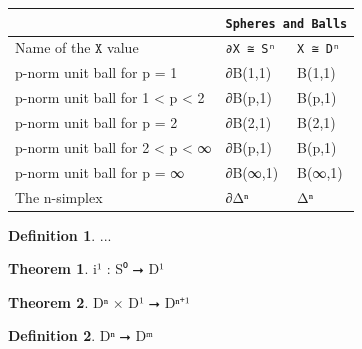 \documentclass{book}
\theoremstyle{definition}
\newtheorem{definition}{Definition}
\newtheorem{theorem}{Theorem}
\begin{document}
{
\footnotesize
\begin{center}
\begin{tabular}{||l || l || l ||} 
 \hline
  & \multicolumn{2}{||c||}{\texttt{Spheres and Balls}} \\
 \hline
 Name of the $\texttt{X}$ value & \texttt{∂X ≅ Sⁿ} & \texttt{X ≅ Dⁿ} \\
 \hline
 \hline
 p-norm unit ball for p = 1 & ∂B(1,1) & B(1,1) \\
 \hline
 p-norm unit ball for 1 < p < 2 & ∂B(p,1) & B(p,1) \\
 \hline
 p-norm unit ball for p = 2 & ∂B(2,1) & B(2,1) \\
 \hline
 p-norm unit ball for 2 < p < ∞ & ∂B(p,1) & B(p,1) \\
 \hline
 p-norm unit ball for p = ∞ & ∂B(∞,1) & B(∞,1) \\
 \hline
 The n-simplex & ∂Δⁿ & Δⁿ \\
 \hline
 \hline
\end{tabular}
\end{center}
}

\begin{definition}
...
\end{definition}

\begin{theorem}
i¹ : S⁰ ⭢ D¹ 
\end{theorem}

\begin{theorem}
Dⁿ × D¹ ⭢ Dⁿ⁺¹
\end{theorem}

\begin{definition}
Dⁿ ⭢ Dᵐ
\end{definition}
\end{document}
